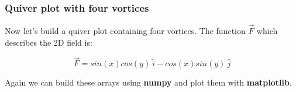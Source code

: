 \documentclass{book}
\begin{document}
    \begin{center}
    \end{center}
    { \hspace*{\fill} \\}
    
    \subsubsection{Quiver plot with four
vortices}\label{quiver-plot-with-four-vortices}

Now let's build a quiver plot containing four vortices. The function
\(\vec{F}\) which describes the 2D field is:

\[ \vec{F} = sin(x)cos(y) \ \hat{i} -cos(x)sin(y) \ \hat{j} \]

Again we can build these arrays using \textbf{numpy} and plot them with
\textbf{matplotlib}.
\end{document}
